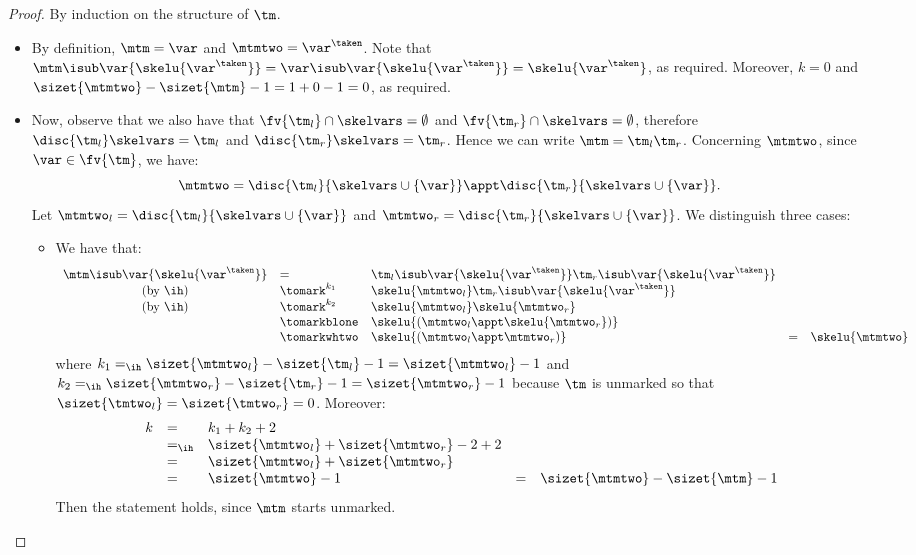 

\begin{proof}
 By induction on the structure of $\tm$.
\begin{itemize}
\item \case{$\tm = \var$} By definition, $\mtm=\var$ and $\mtmtwo = \var^\taken$. Note that $\mtm\isub\var{\skelu{\var^\taken}} = \var\isub\var{\skelu{\var^\taken}} = \skelu{\var^\taken}$, as required.
Moreover, $k = 0$ and $\sizet{\mtmtwo} - \sizet{\mtm}-1=1+0-1=0$, as required.

\item {} Now, observe that we also have that $\fv{\tm_l} \cap \skelvars = \emptyset$ and $\fv{\tm_r} \cap \skelvars = \emptyset$, therefore $\disc{\tm_l}\skelvars = \tm_l$ and $\disc{\tm_r}\skelvars=\tm_r$. Hence we can write $\mtm = \tm_l \tm_r$.
Concerning $\mtmtwo$, since $\var \in \fv{\tm}$, we have:
\[ \mtmtwo = \disc{\tm_l}{\skelvars\cup\{\var\}}\appt\disc{\tm_r}{\skelvars\cup\{\var\}}.\]
Let $\mtmtwo_l = \disc{\tm_l}{\skelvars \cup \{\var\}}$ and $\mtmtwo_r = \disc{\tm_r}{\skelvars \cup \{\var\}}$. We distinguish three cases:
\begin{itemize}
\item {} We have that:
\[\begin{array}{cllllll}
\mtm\isub\var{\skelu{\var^\taken}} &= &
  \tm_l\isub\var{\skelu{\var^\taken}} \tm_r\isub\var{\skelu{\var^\taken}} 
  \\
  \mbox{(by \ih)} &\tomark^{k_1} &
  \skelu{\mtmtwo_l} \tm_r\isub\var{\skelu{\var^\taken}} 
  \\
  \mbox{(by \ih)} &\tomark^{k_2} &
  \skelu{\mtmtwo_l} \skelu{\mtmtwo_r} 
  \\
  &\tomarkblone &
  \skelu{(\mtmtwo_l \appt\skelu{\mtmtwo_r})} 
  \\
  &\tomarkwhtwo &
  \skelu{(\mtmtwo_l\appt\mtmtwo_r)} 
  &=& \skelu{\mtmtwo}
\end{array}\]
where $k_1 =_{\ih} \sizet{\mtmtwo_l} - \sizet{\tm_l} -1= \sizet{\mtmtwo_l} -1$ and $k_2 =_{\ih} \sizet{\mtmtwo_r} - \sizet{\tm_r}-1 = \sizet{\mtmtwo_r}-1$ because $\tm$ is unmarked so that $\sizet{\tmtwo_l} = \sizet{\tmtwo_r} = 0$.
Moreover:
\[\begin{array}{lllllll}
k & = &  k_1 + k_2 +2
\\
& =_{\ih} & \sizet{\mtmtwo_l} + \sizet{\mtmtwo_r} -2 +2
\\
& = & \sizet{\mtmtwo_l} + \sizet{\mtmtwo_r}
\\
& = & \sizet{\mtmtwo} -1
%
& = & \sizet{\mtmtwo} - \sizet{\mtm} -1
\end{array}\]
Then the statement holds, since $\mtm$ starts unmarked.



\end{itemize}
\end{itemize}
\end{proof}
